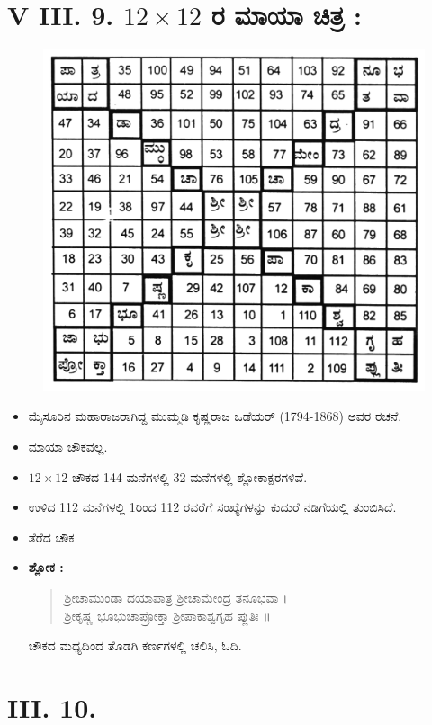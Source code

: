 \section*{V III. 9. $12 \times 12$ ರ ಮಾಯಾ ಚಿತ್ರ :}
\begin{figure}[H]
\includegraphics{src/figures/chap6/fig6-12.jpg}
\end{figure}

\begin{itemize}
	\item ಮೈಸೂರಿನ ಮಹಾರಾಜರಾಗಿದ್ದ ಮುಮ್ಮಡಿ ಕೃಷ್ಣರಾಜ ಒಡೆಯರ್ (1794-1868) ಅವರ ರಚನೆ.
	\item ಮಾಯಾ ಚೌಕವಲ್ಲ.
	\item $12 \times 12$ ಚೌಕದ 144 ಮನೆಗಳಲ್ಲಿ 32 ಮನೆಗಳಲ್ಲಿ ಶ್ಲೋಕಾಕ್ಷರಗಳಿವೆ.
	\item ಉಳಿದ 112 ಮನೆಗಳಲ್ಲಿ 1ರಿಂದ 112 ರವರೆಗೆ ಸಂಖ್ಯೆಗಳನ್ನು ಕುದುರೆ ನಡಿಗೆಯಲ್ಲಿ ತುಂಬಿಸಿದೆ.
	\item ತೆರೆದ ಚೌಕ
	\item \textbf{ಶ್ಲೋಕ :} 
	\begin{quote}
	ಶ್ರೀಚಾಮುಂಡಾ ದಯಾಪಾತ್ರ ಶ್ರೀಚಾಮೇಂದ್ರ ತನೂಭವಾ ।\\
	ಶ್ರೀಕೃಷ್ಣ ಭೂಭುಚಾಪ್ರೋಕ್ತಾ ಶ್ರೀಪಾಕಾಶ್ವಗೃಹ ಪ್ಲುತಿಃ ॥
	\end{quote}
	ಚೌಕದ ಮಧ್ಯದಿಂದ ತೊಡಗಿ ಕರ್ಣಗಳಲ್ಲಿ ಚಲಿಸಿ, ಓದಿ.
\end{itemize}

\section*{ III. 10.}


